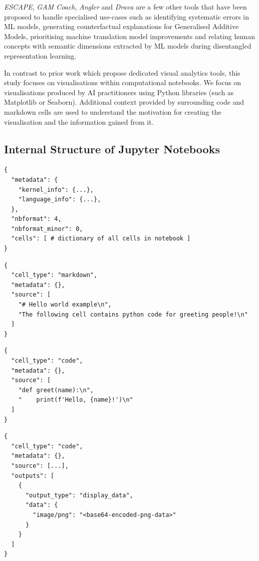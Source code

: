 \documentclass[conference]{IEEEtran}
\begin{document}
\textit{ESCAPE}, \textit{GAM Coach}, \textit{Angler} and \textit{Drava} are a few other tools that have been proposed to handle specialised use-cases such as identifying systematic errors in ML models, generating counterfactual explanations for Generalised Additive Models, prioritising machine translation model improvements and relating human concepts with semantic dimensions extracted by ML models during disentangled representation learning\cite{ahn2023escape, wang2023gam, robertson2023angler, wang2023drava}.

In contrast to prior work which propose dedicated visual analytics tools, this study focuses on visualisations within computational notebooks. We focus on visualisations produced by AI practitioners using Python libraries (such as Matplotlib or Seaborn). Additional context provided by surrounding code and markdown cells are used to understand the motivation for creating the visualisation and the information gained from it.

\subsection{Internal Structure of Jupyter Notebooks}\label{sec:nbformat}

\begin{lstlisting}[caption={Top-level JSON format of Jupyter notebooks. See Listing~\ref{lst:cell-md},~\ref{lst:cell-code} and~\ref{lst:cell-output} for internal structure of various cells.}, label={lst:nbformat}]
{
  "metadata": {
    "kernel_info": {...},
    "language_info": {...},
  },
  "nbformat": 4,
  "nbformat_minor": 0,
  "cells": [ # dictionary of all cells in notebook ]
}
\end{lstlisting}
\begin{lstlisting}[caption={JSON structure of markdown cells.}, label={lst:cell-md}]
{
  "cell_type": "markdown",
  "metadata": {},
  "source": [
    "# Hello world example\n",
    "The following cell contains python code for greeting people!\n"
  ]
}
\end{lstlisting}

\begin{lstlisting}[caption={JSON structure of code cells.}, label={lst:cell-code}]
{
  "cell_type": "code",
  "metadata": {},
  "source": [
    "def greet(name):\n",
    "    print(f'Hello, {name}!')\n"
  ]
}
\end{lstlisting}

\begin{lstlisting}[caption={JSON structure of code cells with an image output.}, label={lst:cell-output}]
{
  "cell_type": "code",
  "metadata": {},
  "source": [...],
  "outputs": [
    {
      "output_type": "display_data",
      "data": {
        "image/png": "<base64-encoded-png-data>"
      }
    }
  ]
}
\end{lstlisting}
\end{document}

